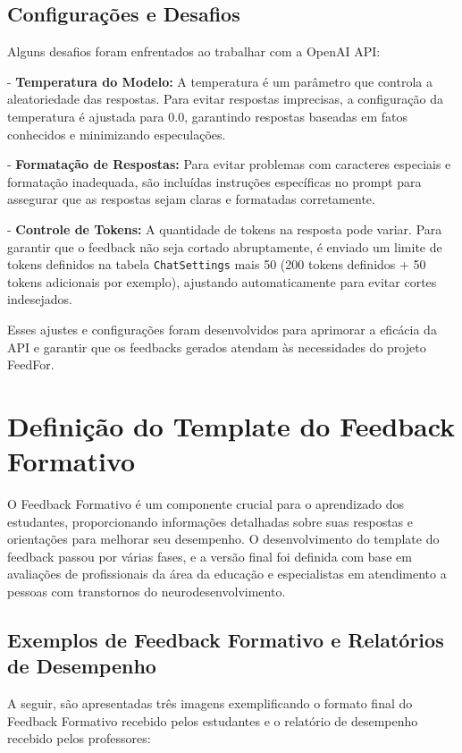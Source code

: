 \subsection{Configurações e Desafios}

Alguns desafios foram enfrentados ao trabalhar com a OpenAI API:

- \textbf{Temperatura do Modelo:} A temperatura é um parâmetro que controla a aleatoriedade das respostas. Para evitar respostas imprecisas, a configuração da temperatura é ajustada para 0.0, garantindo respostas baseadas em fatos conhecidos e minimizando especulações.

- \textbf{Formatação de Respostas:} Para evitar problemas com caracteres especiais e formatação inadequada, são incluídas instruções específicas no prompt para assegurar que as respostas sejam claras e formatadas corretamente.

- \textbf{Controle de Tokens:} A quantidade de tokens na resposta pode variar. Para garantir que o feedback não seja cortado abruptamente, é enviado um limite de tokens definidos na tabela \texttt{ChatSettings} mais 50 (200 tokens definidos + 50 tokens adicionais por exemplo), ajustando automaticamente para evitar cortes indesejados.

Esses ajustes e configurações foram desenvolvidos para aprimorar a eficácia da API e garantir que os feedbacks gerados atendam às necessidades do projeto FeedFor.

\section{Definição do Template do Feedback Formativo}

O Feedback Formativo é um componente crucial para o aprendizado dos estudantes, proporcionando informações detalhadas sobre suas respostas e orientações para melhorar seu desempenho. O desenvolvimento do template do feedback passou por várias fases, e a versão final foi definida com base em avaliações de profissionais da área da educação e especialistas em atendimento a pessoas com transtornos do neurodesenvolvimento.

\subsection{Exemplos de Feedback Formativo e Relatórios de Desempenho}

A seguir, são apresentadas três imagens exemplificando o formato final do Feedback Formativo recebido pelos estudantes e o relatório de desempenho recebido pelos professores:

